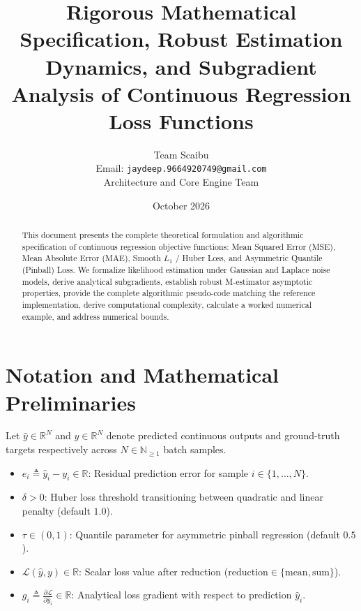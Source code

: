 \documentclass[11pt,a4paper]{article}
\title{\textbf{Rigorous Mathematical Specification, Robust Estimation Dynamics, and Subgradient Analysis of Continuous Regression Loss Functions}}
\author{Team Scaibu \\ \small Email: \texttt{jaydeep.9664920749@gmail.com} \\ \small Architecture and Core Engine Team}
\date{October 2026}
\theoremstyle{definition}
\begin{document}
\maketitle

\begin{abstract}
This document presents the complete theoretical formulation and algorithmic specification of continuous regression objective functions: Mean Squared Error (MSE), Mean Absolute Error (MAE), Smooth $L_1$ / Huber Loss, and Asymmetric Quantile (Pinball) Loss. We formalize likelihood estimation under Gaussian and Laplace noise models, derive analytical subgradients, establish robust M-estimator asymptotic properties, provide the complete algorithmic pseudo-code matching the reference implementation, derive computational complexity, calculate a worked numerical example, and address numerical bounds.
\end{abstract}

\section{Notation and Mathematical Preliminaries}

Let $\hat{y} \in \mathbb{R}^N$ and $y \in \mathbb{R}^N$ denote predicted continuous outputs and ground-truth targets respectively across $N \in \mathbb{N}_{\ge 1}$ batch samples.

\begin{itemize}
    \item $e_i \triangleq \hat{y}_i - y_i \in \mathbb{R}$: Residual prediction error for sample $i \in \{1, \dots, N\}$.
    \item $\delta > 0$: Huber loss threshold transitioning between quadratic and linear penalty (default $1.0$).
    \item $\tau \in (0, 1)$: Quantile parameter for asymmetric pinball regression (default $0.5$).
    \item $\mathcal{L}(\hat{y}, y) \in \mathbb{R}$: Scalar loss value after reduction ($\text{reduction} \in \{\text{mean}, \text{sum}\}$).
    \item $g_i \triangleq \frac{\partial \mathcal{L}}{\partial \hat{y}_i} \in \mathbb{R}$: Analytical loss gradient with respect to prediction $\hat{y}_i$.
\end{itemize}
\end{document}
